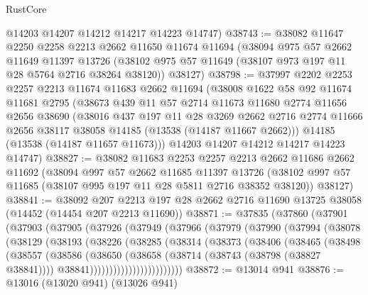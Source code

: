 \begin{lexlean}{RustCore}
\begin{coremodule}
      @14203
      @14207
      @14212
      @14217
      @14223
      @14747)
@38743 := @38082
    @11647
    @2250
    @2258
    @2213
    @2662
    @11650
    @11674
    @11694
    (@38094
      @975
      @57
      @2662
      @11649
      @11397
      @13726
      (@38102 @975 @57 @11649 (@38107 @973 @197 @11 @28 @5764 @2716 @38264 @38120))
      @38127)
@38798 := @37997
    @2202
    @2253
    @2257
    @2213
    @11674
    @11683
    @2662
    @11694
    (@38008
      @1622
      @58
      @92
      @11674
      @11681
      @2795
      (@38673
        @439
        @11
        @57
        @2714
        @11673
        @11680
        @2774
        @11656
        @2656
        @38690
        (@38016
          @437
          @197
          @11
          @28
          @3269
          @2662
          @2716
          @2774
          @11666
          @2656
          @38117
          @38058
          @14185
          (@13538 (@14187 @11667 @2662)))
        @14185
        (@13538 (@14187 @11657 @11673)))
      @14203
      @14207
      @14212
      @14217
      @14223
      @14747)
@38827 := @38082
    @11683
    @2253
    @2257
    @2213
    @2662
    @11686
    @2662
    @11692
    (@38094
      @997
      @57
      @2662
      @11685
      @11397
      @13726
      (@38102 @997 @57 @11685 (@38107 @995 @197 @11 @28 @5811 @2716 @38352 @38120))
      @38127)
@38841 := @38092
    @207
    @2213
    @197
    @28
    @2662
    @2716
    @11690
    @13725
    @38058
    (@14452 (@14454 @207 @2213 @11690))
@38871 := @37835
    (@37860
      (@37901
        (@37903
          (@37905
            (@37926
              (@37949
                (@37966
                  (@37979
                    (@37990
                      (@37994
                        (@38078
                          (@38129
                            (@38193
                              (@38226
                                (@38285
                                  (@38314
                                    (@38373
                                      (@38406
                                        (@38465
                                          (@38498
                                            (@38557
                                              (@38586
                                                (@38650
                                                  (@38658
                                                    (@38714 (@38743 (@38798 (@38827 @38841))))
                                                    @38841))))))))))))))))))))))))
@38872 := @13014 @941
@38876 := @13016 (@13020 @941) (@13026 @941)

\end{coremodule}
\end{lexlean}
